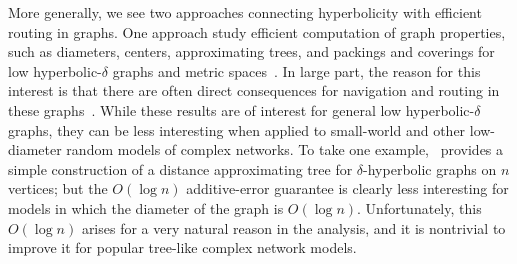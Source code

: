 \documentclass[11pt]{article}
\begin{document}
%

More generally, we see two approaches connecting hyperbolicity with efficient routing in
graphs. One approach study efficient computation of graph properties, such as
diameters, centers, approximating trees, and 
packings and coverings for low hyperbolic-$\delta$ graphs and
metric spaces~\cite{chepoi2008diameters,CD00,GL05,CDEHVX10,CE07}.
In large part, the reason for this interest is that there are often direct 
consequences for navigation and routing in these 
graphs~\cite{GL05,CDEHVX10,Kle07,ABKMRT07}.
While these results are 
of interest for general low hyperbolic-$\delta$ graphs, they can be less interesting when applied to 
small-world and other low-diameter random models of complex networks.
To take one example,~\cite{chepoi2008diameters} provides a simple construction of a 
distance approximating tree for $\delta$-hyperbolic graphs on $n$ vertices; 
but the $O(\log n)$ additive-error guarantee is clearly less interesting for 
models in which the diameter of the graph is $O(\log n)$.
Unfortunately, this $O(\log n)$ arises for a very natural reason in the 
analysis, and it is nontrivial to improve it for popular tree-like complex 
network models.
\end{document}
